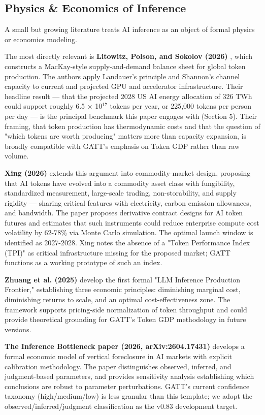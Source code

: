 \documentclass[11pt,a4paper]{article}
\begin{document}
\subsection{Physics \& Economics of Inference}

A small but growing literature treats AI inference as an object of formal physics or economics modeling.

The most directly relevant is \textbf{Litowitz, Polson, and Sokolov (2026)} \cite{litowitz2026photons}, which constructs a MacKay-style supply-and-demand balance sheet for global token production. The authors apply Landauer's principle \cite{landauer1961irreversibility} and Shannon's channel capacity \cite{shannon1948mathematical} to current and projected GPU and accelerator infrastructure. Their headline result --- that the projected 2028 US AI energy allocation of 326 TWh could support roughly 6.5 × 10$^{17}$ tokens per year, or 225,000 tokens per person per day --- is the principal benchmark this paper engages with (Section 5). Their framing, that token production has thermodynamic costs and that the question of "which tokens are worth producing" matters more than capacity expansion, is broadly compatible with GATT's emphasis on Token GDP rather than raw volume.

\textbf{Xing (2026)} \cite{xing2026token} extends this argument into commodity-market design, proposing that AI tokens have evolved into a commodity asset class with fungibility, standardized measurement, large-scale trading, non-storability, and supply rigidity --- sharing critical features with electricity, carbon emission allowances, and bandwidth. The paper proposes derivative contract designs for AI token futures and estimates that such instruments could reduce enterprise compute cost volatility by 62-78\% via Monte Carlo simulation. The optimal launch window is identified as 2027-2028. Xing notes the absence of a "Token Performance Index (TPI)" as critical infrastructure missing for the proposed market; GATT functions as a working prototype of such an index.

\textbf{Zhuang et al. (2025)} \cite{zhuang2025beyond} develop the first formal "LLM Inference Production Frontier," establishing three economic principles: diminishing marginal cost, diminishing returns to scale, and an optimal cost-effectiveness zone. The framework supports pricing-side normalization of token throughput and could provide theoretical grounding for GATT's Token GDP methodology in future versions.

\textbf{The Inference Bottleneck paper (2026, arXiv:2604.17431)} \cite{inference2026bottleneck} develops a formal economic model of vertical foreclosure in AI markets with explicit calibration methodology. The paper distinguishes observed, inferred, and judgment-based parameters, and provides sensitivity analysis establishing which conclusions are robust to parameter perturbations. GATT's current confidence taxonomy (high/medium/low) is less granular than this template; we adopt the observed/inferred/judgment classification as the v0.83 development target.
\end{document}
